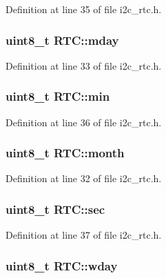 Definition at line 35 of file i2c\-\_\-rtc.\-h.

\hypertarget{structRTC_a8572937f310a4d7de1b5229d05c1c5af}{
\subsubsection[{mday}]{\setlength{\rightskip}{0pt plus 5cm}uint8\-\_\-t R\-T\-C\-::mday}}\label{structRTC_a8572937f310a4d7de1b5229d05c1c5af}


Definition at line 33 of file i2c\-\_\-rtc.\-h.

\hypertarget{structRTC_a09bf7e86654a65b51df00b38e22b8044}{
\subsubsection[{min}]{\setlength{\rightskip}{0pt plus 5cm}uint8\-\_\-t R\-T\-C\-::min}}\label{structRTC_a09bf7e86654a65b51df00b38e22b8044}


Definition at line 36 of file i2c\-\_\-rtc.\-h.

\hypertarget{structRTC_ab3edfa995dc98159d1ecaa5e7cb9fb8e}{
\subsubsection[{month}]{\setlength{\rightskip}{0pt plus 5cm}uint8\-\_\-t R\-T\-C\-::month}}\label{structRTC_ab3edfa995dc98159d1ecaa5e7cb9fb8e}


Definition at line 32 of file i2c\-\_\-rtc.\-h.

\hypertarget{structRTC_a224a3d103a21f1e60b042e7a7a76c882}{
\subsubsection[{sec}]{\setlength{\rightskip}{0pt plus 5cm}uint8\-\_\-t R\-T\-C\-::sec}}\label{structRTC_a224a3d103a21f1e60b042e7a7a76c882}


Definition at line 37 of file i2c\-\_\-rtc.\-h.

\hypertarget{structRTC_ab3b1c5e52d95f4c763cdbfe7316ab6a9}{
\subsubsection[{wday}]{\setlength{\rightskip}{0pt plus 5cm}uint8\-\_\-t R\-T\-C\-::wday}}\label{structRTC_ab3b1c5e52d95f4c763cdbfe7316ab6a9}



